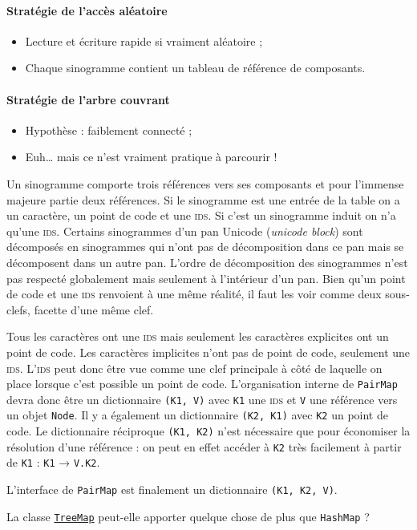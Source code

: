 \paragraph{Stratégie de l'accès aléatoire}
\begin{itemize}
\item Lecture et écriture rapide si vraiment aléatoire ;
\item Chaque sinogramme contient un tableau de référence de composants.
\end{itemize}

\paragraph{Stratégie de l'arbre couvrant}
\begin{itemize}
\item Hypothèse : faiblement connecté ;
\item Euh\dots{} mais ce n'est vraiment pratique à parcourir !
\end{itemize}

Un sinogramme comporte trois références vers ses composants et pour l'immense majeure partie deux références. Si le sinogramme est une entrée de la table on a un caractère, un point de code et une \textsc{ids}. Si c'est un sinogramme induit on n'a qu'une \textsc{ids}. Certains sinogrammes d'un pan Unicode (\textsl{unicode block}) sont décomposés en sinogrammes qui n'ont pas de décomposition dans ce pan mais se décomposent dans un autre pan. L'ordre de décomposition des sinogrammes n'est pas respecté globalement mais seulement à l'intérieur d'un pan. Bien qu'un point de code et une \textsc{ids} renvoient à une même réalité, il faut les voir comme deux sous-clefs, facette d'une même clef.

Tous les caractères ont une \textsc{ids} mais seulement les caractères explicites ont un point de code. Les caractères implicites n'ont pas de point de code, seulement une \textsc{ids}. L'\textsc{ids} peut donc être vue comme une clef principale à côté de laquelle on place lorsque c'est possible un point de code. L'organisation interne de \texttt{PairMap} devra donc être un dictionnaire \texttt{(K1, V)} avec \texttt{K1} une \textsc{ids} et \texttt{V} une référence vers un objet \texttt{Node}. Il y a également un dictionnaire \texttt{(K2, K1)} avec \texttt{K2} un point de code. Le dictionnaire réciproque \texttt{(K1, K2)} n'est nécessaire que pour économiser la résolution d'une référence : on peut en effet accéder à \texttt{K2} très facilement à partir de \texttt{K1} : \texttt{K1} → \texttt{V.K2}.

L'interface de \texttt{PairMap} est finalement un dictionnaire \texttt{(K1, K2, V)}.

La classe \href{http://download.java.net/jdk8u20/docs/api/java/util/TreeMap.html}{\texttt{TreeMap}} peut-elle apporter quelque chose de plus que \texttt{HashMap} ?
